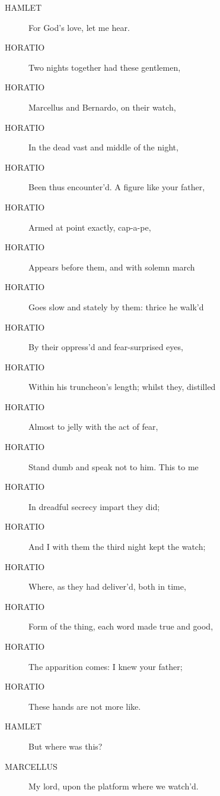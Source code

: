 \documentclass{article}
\begin{document}
\begin{description}
            
\item[HAMLET] For God's love, let me hear.
\end{description}
          
\begin{description}
            
\item[HORATIO] Two nights together had these gentlemen,
\item[HORATIO] Marcellus and Bernardo, on their watch,
\item[HORATIO] In the dead vast and middle of the night,
\item[HORATIO] Been thus encounter'd. A figure like your father,
\item[HORATIO] Armed at point exactly, cap-a-pe,
\item[HORATIO] Appears before them, and with solemn march
\item[HORATIO] Goes slow and stately by them: thrice he walk'd
\item[HORATIO] By their oppress'd and fear-surprised eyes,
\item[HORATIO] Within his truncheon's length; whilst they, distilled
\item[HORATIO] Almost to jelly with the act of fear,
\item[HORATIO] Stand dumb and speak not to him. This to me
\item[HORATIO] In dreadful secrecy impart they did;
\item[HORATIO] And I with them the third night kept the watch;
\item[HORATIO] Where, as they had deliver'd, both in time,
\item[HORATIO] Form of the thing, each word made true and good,
\item[HORATIO] The apparition comes: I knew your father;
\item[HORATIO] These hands are not more like.
\end{description}
          
\begin{description}
            
\item[HAMLET] But where was this?
\end{description}
          
\begin{description}
            
\item[MARCELLUS] My lord, upon the platform where we watch'd.
\end{description}
          
\end{document}
